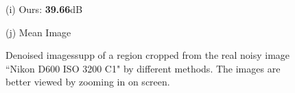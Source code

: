 \documentclass[10pt,onecolumn,letterpaper]{article}
\begin{document}
\begin{figure}[H]
{\begin{minipage}[t]{0.196\textwidth}
{\footnotesize (i) Ours: \textbf{39.66}dB  }
\end{minipage}
\begin{minipage}[t]{0.196\textwidth}
\centering
{}
{\footnotesize (j) Mean Image \cite{crosschannel2016} }
\end{minipage}
}
\caption{Denoised imagessupp of a region cropped from the real noisy image ``Nikon D600 ISO 3200 C1" \cite{crosschannel2016} by different methods. The images are better viewed by zooming in on screen.} 
\label{fig12}
\end{figure}
\end{document}
